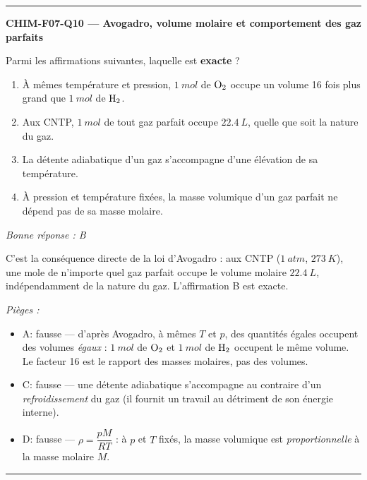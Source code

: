 \documentclass[11pt,a4paper]{article}
\begin{document}
\vspace{8pt}\hrule\vspace{8pt}
\noindent\textbf{CHIM-F07-Q10 --- Avogadro, volume molaire et comportement des gaz parfaits}\par
Parmi les affirmations suivantes, laquelle est \textbf{exacte} ?
\begin{enumerate}[label=\Alph*)]
\item À mêmes température et pression, $\qty{1}{mol}$ de $\ce{O2}$ occupe un volume 16 fois plus grand que $\qty{1}{mol}$ de $\ce{H2}$.
\item Aux CNTP, $\qty{1}{mol}$ de tout gaz parfait occupe $\qty{22.4}{L}$, quelle que soit la nature du gaz.
\item La détente adiabatique d'un gaz s'accompagne d'une élévation de sa température.
\item À pression et température fixées, la masse volumique d'un gaz parfait ne dépend pas de sa masse molaire.
\end{enumerate}
\textit{Bonne réponse : B}\par
C'est la conséquence directe de la loi d'Avogadro : aux CNTP ($\qty{1}{atm}$, $\qty{273}{K}$), une mole de n'importe quel gaz parfait occupe le volume molaire $\qty{22.4}{L}$, indépendamment de la nature du gaz. L'affirmation B est exacte.\par
\textit{Pièges :}
\begin{itemize}
\item A: fausse --- d'après Avogadro, à mêmes $T$ et $p$, des quantités égales occupent des volumes \emph{égaux} : $\qty{1}{mol}$ de $\ce{O2}$ et $\qty{1}{mol}$ de $\ce{H2}$ occupent le même volume. Le facteur 16 est le rapport des masses molaires, pas des volumes.
\item C: fausse --- une détente adiabatique s'accompagne au contraire d'un \emph{refroidissement} du gaz (il fournit un travail au détriment de son énergie interne).
\item D: fausse --- $\rho=\dfrac{pM}{RT}$ : à $p$ et $T$ fixés, la masse volumique est \emph{proportionnelle} à la masse molaire $M$.
\end{itemize}
\vspace{8pt}\hrule\vspace{8pt}
\end{document}
